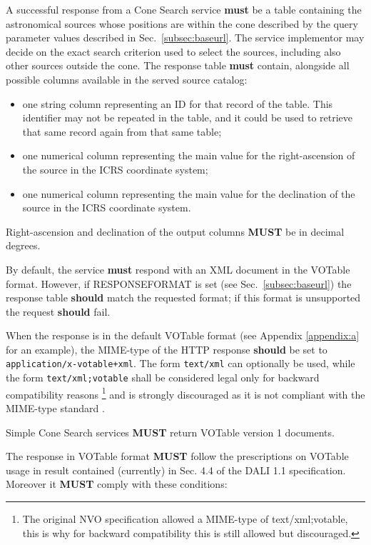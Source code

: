 \documentclass[11pt,a4paper]{ivoa}
\begin{document}
A successful response from a Cone Search service \textbf{must} be a
table containing the astronomical sources whose positions are within the
cone described by the query parameter values described in
Sec.~\ref{subsec:baseurl}. The service implementor may decide on the exact
search criterion used to select the sources, including also other
sources outside the cone.
The response table \textbf{must} contain, alongside all possible columns
available in the served source catalog:
\begin{itemize}
	\item one string column representing an ID for that record of the table.
		This identifier may not be repeated in the table, and it could be used to
		retrieve that same record again from that same table;
	\item one numerical column representing the main value for the
		right-ascension of the source in the ICRS coordinate system;
	\item one numerical column representing the main value for the
		declination of the source in the ICRS coordinate system.
\end{itemize}
Right-ascension and declination of the output columns \textbf{MUST} be in decimal degrees.

By default, the service \textbf{must} respond with an XML document in the
VOTable\citep{2025ivoa.spec.0116O} format. However, if RESPONSEFORMAT is
set (see Sec.~\ref{subsec:baseurl}) the response table \textbf{should}
match the requested format; if this format is unsupported the request
\textbf{should} fail.

When the response is in the default VOTable format (see Appendix \ref{appendix:a}
for an example), the MIME-type of the HTTP response \textbf{should} be
set to \texttt{application/x-votable+xml}. The form
\texttt{text/xml} can optionally be used, while the
form \texttt{text/xml;votable} shall be considered legal
only for backward compatibility reasons
\footnote{
	The original NVO specification allowed a MIME-type of text/xml;votable,
	this is why for backward compatibility this is still allowed but discouraged.
}
and is strongly discouraged as it is not compliant with the MIME-type
standard \citep{std:MIME}. 

Simple Cone Search services \textbf{MUST} return VOTable
version 1 documents.

The response in VOTable format \textbf{MUST} follow the prescriptions on
VOTable usage in result contained (currently) in Sec. 4.4 of the DALI 1.1
specification. Moreover it \textbf{MUST} comply with these conditions:
\end{document}
